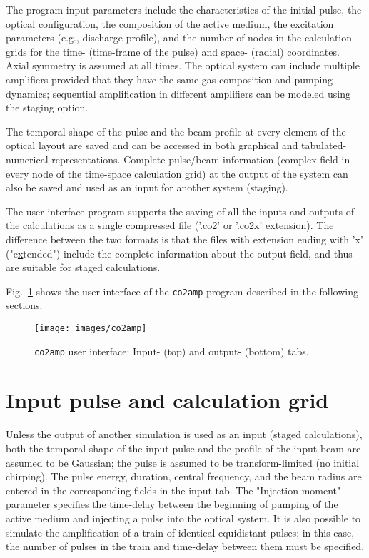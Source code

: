 \documentclass{report}
\begin{document}
The program input parameters include the characteristics of the initial pulse, the optical configuration, the composition of the active medium, the excitation parameters (e.g., discharge profile), and the number of nodes in the calculation grids for the time- (time-frame of the pulse) and space- (radial) coordinates. Axial symmetry is assumed at all times. The optical system can include multiple amplifiers provided that they have the same gas composition and pumping dynamics; sequential amplification in different amplifiers can be modeled using the staging option.

The temporal shape of the pulse and the beam profile at every element of the optical layout are saved and can be accessed in both graphical and tabulated-numerical representations. Complete pulse/beam information (complex field in every node of the time-space calculation grid) at the output of the system can also be saved and used as an input for another system (staging).

The user interface program supports the saving of all the inputs and outputs of the calculations as a single compressed file ('.co2' or '.co2x' extension). The difference between the two formats is that the files with extension ending with 'x' ("e\underline{x}tended") include the complete information about the output field, and thus are suitable for staged calculations.

Fig.~\ref{fig:co2amp} shows the user interface of the \texttt{co2amp} program described in the following sections.

\begin{figure}[ht]
\centering
\texttt{[image: images/co2amp]}
\caption{\texttt{co2amp} user interface: Input- (top) and output- (bottom) tabs.}\label{fig:co2amp}
\end{figure}


\section{Input pulse and calculation grid}
Unless the output of another simulation is used as an input (staged calculations), both the temporal shape of the input pulse and the profile of the input beam are assumed to be Gaussian; the pulse is assumed to be transform-limited (no initial chirping). The pulse energy, duration, central frequency, and the beam radius are entered in the corresponding fields in the input tab. The "Injection moment" parameter specifies the time-delay between the beginning of pumping of the active medium and injecting a pulse into the optical system. It is also possible to simulate the amplification of a train of identical equidistant pulses; in this case, the number of pulses in the train and time-delay between them must be specified.
\end{document}
